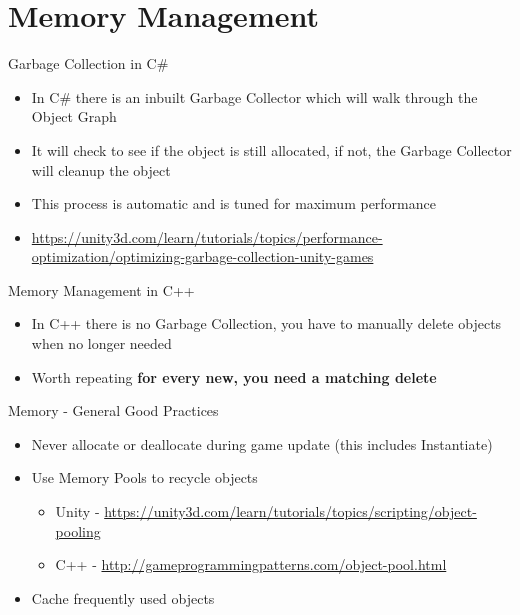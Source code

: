 \part{Memory Management}
\frame{\partpage}

\begin{frame}{Garbage Collection in C\#}
	\begin{itemize}
		\pause \item In C\# there is an inbuilt Garbage Collector which will  walk through the Object Graph
		\pause \item It will check to see if the object is still allocated, if not, the Garbage Collector will cleanup the object
		\pause \item This process is automatic and is tuned for maximum performance
		\pause \item \url{https://unity3d.com/learn/tutorials/topics/performance-optimization/optimizing-garbage-collection-unity-games}
	\end{itemize}
\end{frame}

\begin{frame}{Memory Management in C++}
	\begin{itemize}
		\pause \item In C++ there is no Garbage Collection, you have to manually delete objects when no longer needed
		\pause \item Worth repeating  \textbf{for every new, you need a matching delete}
	\end{itemize}
\end{frame}

\begin{frame}{Memory - General Good Practices}
	\begin{itemize}
		\pause \item Never allocate or deallocate during game update (this includes Instantiate)
		\pause \item Use Memory Pools to recycle objects
		\begin{itemize}
			\pause \item Unity - \url{https://unity3d.com/learn/tutorials/topics/scripting/object-pooling}
			\pause \item C++ - \url{http://gameprogrammingpatterns.com/object-pool.html} 
		\end{itemize}  
		\pause \item Cache frequently used objects
	\end{itemize}
\end{frame}
